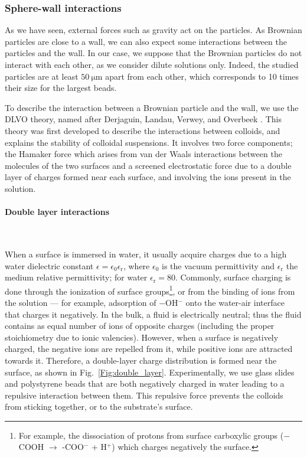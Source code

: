 \subsubsection{Sphere-wall interactions}
\label{Section:sphere-wall}



As we have seen, external forces such as gravity act on the particles. As Brownian particles are close to a wall, we can also expect some interactions between the particles and the wall. In our case, we suppose that the Brownian particles do not interact with each other, as we consider dilute solutions only. Indeed, the studied particles are at least $50 ~ \mathrm{\mu m}$ apart from each other, which corresponds to 10 times their size for the largest beads. 

To describe the interaction between a Brownian particle and the wall, we use the DLVO theory, named after Derjaguin, Landau, Verwey, and Overbeek \cite{israelachvili_intermolecular_2015}. This theory was first developed to describe the interactions between colloids, and explains the stability of colloidal suspensions. It involves two force components; the Hamaker force which arises from van der Waals interactions between the molecules of the two surfaces and a screened electrostatic force due to a double layer of charges formed near each surface, and involving the ions present in the solution. 

\paragraph{Double layer interactions}\mbox{}\\
\label{subsec:double}
\vspace{0.10cm}


When a surface is immersed in water, it usually acquire charges \cite{israelachvili_intermolecular_2015} due to a high water dielectric constant $\epsilon = \epsilon_0 \epsilon_\mathrm{r}$, where $\epsilon_0$ is the vacuum permittivity and $\epsilon_\mathrm{r}$ the medium relative permittivity; for water $\epsilon_\mathrm{r} = 80$. Commonly, surface charging is done through the ionization of  surface groups\footnote{For example, the dissociation of protons from surface carboxylic groups \cite{israelachvili_intermolecular_2015} ($-$COOH $\rightarrow$ -COO$^-$ + H$^+$) which charges negatively the surface.}, or from the binding of ions from the solution --- for example, adsorption of $-$OH$^-$ onto the water-air interface that charges it negatively. In the bulk, a fluid is electrically neutral; thus the fluid contains as equal number of ions of opposite charges (including the proper stoichiometry due to ionic valencies). However, when a surface is negatively charged, the negative ions are repelled from it, while positive ions are attracted towards it.  Therefore, a double-layer charge distribution is formed near the surface, as shown in Fig.~\ref{Fig:double_layer}. Experimentally, we use glass slides and polystyrene beads that are both negatively charged in water leading to a repulsive interaction between them. This repulsive force prevents the colloids from sticking together, or to the substrate's surface.

